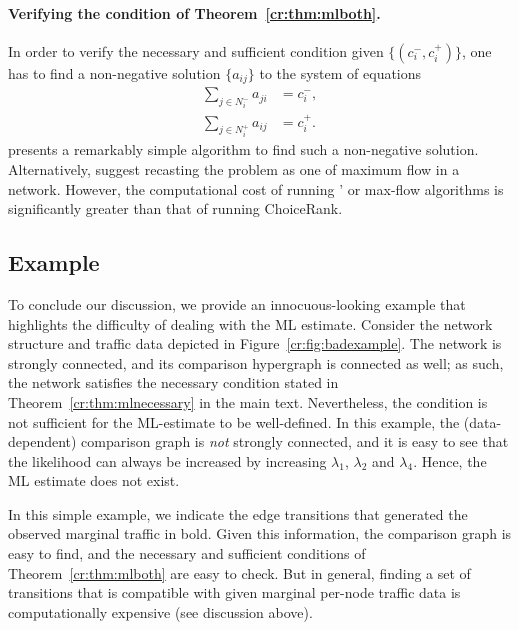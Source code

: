 \paragraph{Verifying the condition of Theorem~\ref{cr:thm:mlboth}.}
In order to verify the necessary and sufficient condition given $\{ (c^-_i, c^+_i) \}$, one has to find a non-negative solution $\{ a_{ij} \}$ to the system of equations
\begin{align*}
\sum_{j \in N^-_i} a_{ji} &= c^-_i, \\
\sum_{j \in N^+_i} a_{ij} &= c^+_i.
\end{align*}
\citet{dines1926positive} presents a remarkably simple algorithm to find such a non-negative solution.
Alternatively, \citet{kumar2015inverting} suggest recasting the problem as one of maximum flow in a network.
However, the computational cost of running \citeauthor{dines1926positive}' or max-flow algorithms is significantly greater than that of running ChoiceRank.

\subsection{Example}

To conclude our discussion, we provide an innocuous-looking example that highlights the difficulty of dealing with the ML estimate.
Consider the network structure and traffic data depicted in Figure~\ref{cr:fig:badexample}.
The network is strongly connected, and its comparison hypergraph is connected as well; as such, the network satisfies the necessary condition stated in Theorem~\ref{cr:thm:mlnecessary} in the main text.
Nevertheless, the condition is not sufficient for the ML-estimate to be well-defined.
In this example, the (data-dependent) comparison graph is \emph{not} strongly connected, and it is easy to see that the likelihood can always be increased by increasing $\lambda_1$, $\lambda_2$ and $\lambda_4$.
Hence, the ML estimate does not exist.

In this simple example, we indicate the edge transitions that generated the observed marginal traffic in bold.
Given this information, the comparison graph is easy to find, and the necessary and sufficient conditions of Theorem~\ref{cr:thm:mlboth} are easy to check.
But in general, finding a set of transitions that is compatible with given marginal per-node traffic data is computationally expensive (see discussion above).
